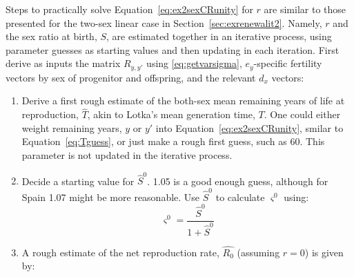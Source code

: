 
 \FloatBarrier
\label{sec:ex2sexCRit}
Steps to practically solve Equation~\eqref{eq:ex2sexCRunity} for $r$ are
similar to those presented for the two-sex linear case in
Section~\ref{sec:exrenewalit2}. Namely, $r$ and the sex ratio at birth, $S$, are
estimated together in an iterative process, using parameter guesses as starting
values and then updating in each iteration. First derive as inputs the matrix
$R_{y,y'}$ using \eqref{eq:getvarsigma}, $e_y$-specific fertility vectors by
sex of progenitor and offspring, and the relevant $d_x$ vectors:
\begin{enumerate}
  \item Derive a first rough estimate of the both-sex mean remaining years of
  life at reproduction, $\widehat{T}$, akin to Lotka's mean generation time,
  $T$. One could either weight remaining years, $y$ or $y'$ into
  Equation~\ref{eq:ex2sexCRunity}, smilar to Equation~\ref{eq:Tguess}, or just
  make a rough first guess, such as 60. This parameter is not updated in the
  iterative process.

\item Decide a starting value for $\hat{S}^0$. 1.05 is a good enough guess,
although for Spain 1.07 might be more reasonable. Use $\hat{S}^0$ to calculate
$\varsigma^0$ using:
\begin{equation}
\label{eq:getvarsigma}
\varsigma^0 = \frac{\hat{S}^0}{1+\hat{S}^0}
\end{equation}

  \item A rough estimate of the net reproduction rate, $\widehat{R_0}$ (assuming
  $r=0$) is given by:


\end{enumerate}
